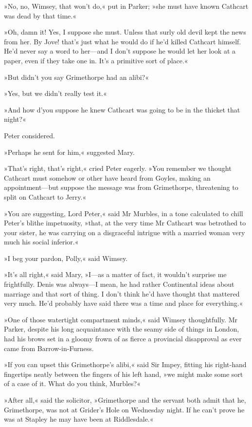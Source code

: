 »No, no, Wimsey, that won't do,« put in Parker; »she must have known Cathcart was dead by that time.«

»Oh, damn it! Yes, I suppose she must. Unless that surly old devil kept the news from her. By Jove! that's just what he would do if he'd killed Cathcart himself. He'd never say a word to her—and I don't suppose he would let her look at a paper, even if they take one in. It's a primitive sort of place.«

»But didn't you say Grimethorpe had an alibi?«

»Yes, but we didn't really test it.«

»And how d'you suppose he knew Cathcart was going to be in the thicket that night?«

Peter considered.

»Perhaps he sent for him,« suggested Mary.

»That's right, that's right,« cried Peter eagerly. »You remember we thought Cathcart must somehow or other have heard from Goyles, making an appointment—but suppose the message was from Grimethorpe, threatening to split on Cathcart to Jerry.«

»You are suggesting, Lord Peter,« said Mr Murbles, in a tone calculated to chill Peter's blithe impetuosity, »that, at the very time Mr Cathcart was betrothed to your sister, he was carrying on a disgraceful intrigue with a married woman very much his social inferior.«

»I beg your pardon, Polly,« said Wimsey.

»It's all right,« said Mary, »I—as a matter of fact, it wouldn't surprise me frightfully. Denis was always—I mean, he had rather Continental ideas about marriage and that sort of thing. I don't think he'd have thought that mattered very much. He'd probably have said there was a time and place for everything.«

»One of those watertight compartment minds,« said Wimsey thoughtfully.  Mr Parker, despite his long acquaintance with the seamy side of things in London, had his brows set in a gloomy frown of as fierce a provincial disapproval as ever came from Barrow-in-Furness.

»If you can upset this Grimethorpe's alibi,« said Sir Impey, fitting his right-hand fingertips neatly between the fingers of his left hand, »we might make some sort of a case of it. What do you think, Murbles?«

»After all,« said the solicitor, »Grimethorpe and the servant both admit that he, Grimethorpe, was not at Grider's Hole on Wednesday night. If he can't prove he was at Stapley he may have been at Riddlesdale.«


